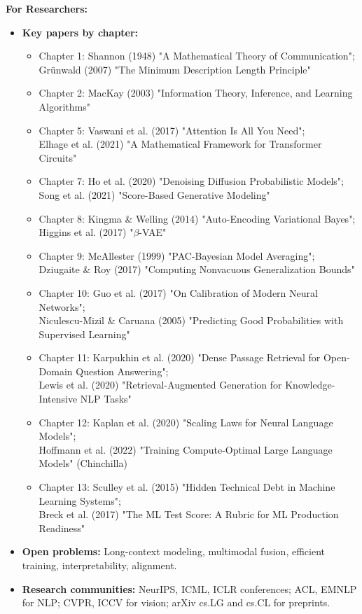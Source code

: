 \vspace{0.5em}

\textbf{For Researchers:}

\begin{itemize}
\item \textbf{Key papers by chapter:}
  \begin{itemize}
  \item Chapter 1: Shannon (1948) "A Mathematical Theory of Communication";\\ Gr\"unwald (2007) "The Minimum Description Length Principle"
  \item Chapter 2: MacKay (2003) "Information Theory, Inference, and Learning Algorithms"
  \item Chapter 5: Vaswani et al. (2017) "Attention Is All You Need";\\ Elhage et al. (2021) "A Mathematical Framework for Transformer Circuits"
  \item Chapter 7: Ho et al. (2020) "Denoising Diffusion Probabilistic Models";\\ Song et al. (2021) "Score-Based Generative Modeling"
  \item Chapter 8: Kingma \& Welling (2014) "Auto-Encoding Variational Bayes";\\ Higgins et al. (2017) "$\beta$-VAE"
  \item Chapter 9: McAllester (1999) "PAC-Bayesian Model Averaging";\\ Dziugaite \& Roy (2017) "Computing Nonvacuous Generalization Bounds"
  \item Chapter 10: Guo et al. (2017) "On Calibration of Modern Neural Networks";\\ Niculescu-Mizil \& Caruana (2005) "Predicting Good Probabilities with Supervised Learning"
  \item Chapter 11: Karpukhin et al. (2020) "Dense Passage Retrieval for Open-Domain Question Answering";\\ Lewis et al. (2020) "Retrieval-Augmented Generation for Knowledge-Intensive NLP Tasks"
  \item Chapter 12: Kaplan et al. (2020) "Scaling Laws for Neural Language Models";\\ Hoffmann et al. (2022) "Training Compute-Optimal Large Language Models" (Chinchilla)
  \item Chapter 13: Sculley et al. (2015) "Hidden Technical Debt in Machine Learning Systems";\\ Breck et al. (2017) "The ML Test Score: A Rubric for ML Production Readiness"
  \end{itemize}
\item \textbf{Open problems:} Long-context modeling, multimodal fusion, efficient training, interpretability, alignment.
\item \textbf{Research communities:} NeurIPS, ICML, ICLR conferences; ACL, EMNLP for NLP; CVPR, ICCV for vision; arXiv cs.LG and cs.CL for preprints.
\end{itemize}

